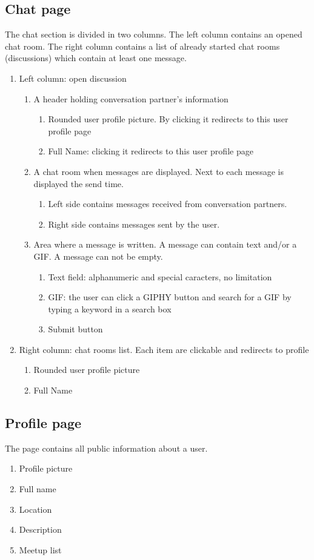 \documentclass[conference]{IEEEtran}
\begin{document}
\subsection{Chat page}
    The chat section is divided in two columns. The left column contains an opened chat room. The right column contains a list of already started chat rooms (discussions) which contain at least one message.
    \begin{enumerate}
        \item Left column: open discussion
        \begin{enumerate}
            \item A header holding conversation partner's information
            \begin{enumerate}
                \item Rounded user profile picture. By clicking it redirects to this user profile page
                \item Full Name: clicking it redirects to this user profile page
            \end{enumerate}
            \item A chat room when messages are displayed. Next to each message is displayed the send time.
            \begin{enumerate}
                \item Left side contains messages received from conversation partners.
                \item Right side contains messages sent by the user.
            \end{enumerate}
            \item Area where a message is written. A message can contain text and/or a GIF. A message can not be empty.
            \begin{enumerate}
                \item Text field: alphanumeric and special caracters, no limitation
                \item GIF: the user can click a GIPHY button and search for a GIF by typing a keyword in a search box
                \item Submit button
            \end{enumerate}
        \end{enumerate}
        \item Right column: chat rooms list. Each item are clickable and redirects to profile
            \begin{enumerate}
                \item Rounded user profile picture
                \item Full Name
            \end{enumerate}
\end{enumerate}

\subsection{Profile page}
The page contains all public information about a user.
\begin{enumerate}
    \item Profile picture
    \item Full name
    \item Location
    \item Description
    \item Meetup list
\end{enumerate}
\end{document}
